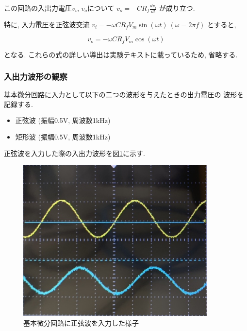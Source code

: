 \documentclass[titlepage]{jsarticle}
\begin{document}
        この回路の入出力電圧$v_i$, $v_o$について
        $\displaystyle v_o = -CR_f\frac{dv_i}{dt}$
        が成り立つ.

        特に, 入力電圧を正弦波交流
        $v_i = -\omega CR_fV_m\sin(\omega t) \ (\omega = 2\pi f)$
        とすると,

        \begin{equation}
            v_o = -\omega CR_fV_m\cos(\omega t) \label{equ:dif}
        \end{equation}

        となる.
        これらの式の詳しい導出は実験テキスト\cite{text}に載っているため,
        省略する.

        \subsubsection{入出力波形の観察}
            基本微分回路に入力として以下の二つの波形を与えたときの出力電圧の
            波形を記録する.

            \begin{itemize}
                \item 正弦波 (振幅0.5V, 周波数1kHz)
                \item 矩形波 (振幅0.5V, 周波数1kHz)
            \end{itemize}

            正弦波を入力した際の入出力波形を図\ref{fig:dif1}に示す.

            \begin{figure}[h]
                \centering
                \includegraphics[width=10cm]{img/dif-graph1.jpg}
                \caption{基本微分回路に正弦波を入力した様子}
                \label{fig:dif1}
            \end{figure}
\end{document}
